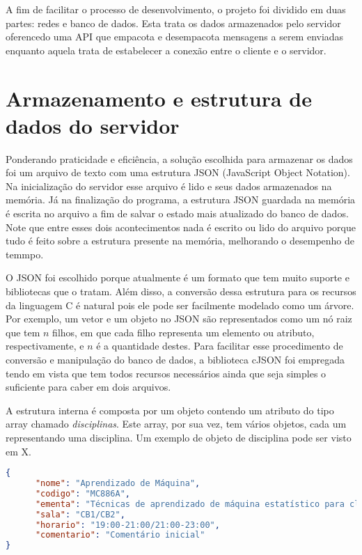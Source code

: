 \documentclass[
	article,			%
	11pt,				%
	oneside,			%
	a4paper,			%
	hidelinks,
	english,			%
	brazil,				%
	sumario=abnt-6027-2012
	]{abntex2}
\begin{document}
A fim de facilitar o processo de desenvolvimento, o projeto foi dividido em duas partes: redes e banco de dados. Esta trata os dados armazenados pelo servidor oferencedo uma API que empacota e desempacota mensagens a serem enviadas enquanto aquela trata de estabelecer a conexão entre o cliente e o servidor.

\section{Armazenamento e estrutura de dados do servidor}

Ponderando praticidade e eficiência, a solução escolhida para armazenar os dados foi um arquivo de texto com uma estrutura JSON (JavaScript Object Notation). Na inicialização do servidor esse arquivo é lido e seus dados armazenados na memória. Já na finalização do programa, a estrutura JSON guardada na memória é escrita no arquivo a fim de salvar o estado mais atualizado do banco de dados. Note que entre esses dois acontecimentos nada é escrito ou lido do arquivo porque tudo é feito sobre a estrutura presente na memória, melhorando o desempenho de temmpo.

O JSON foi escolhido porque atualmente é um formato que tem muito suporte e bibliotecas que o tratam. Além disso, a conversão dessa estrutura para os recursos da linguagem C é natural pois ele pode ser facilmente modelado como um árvore. Por exemplo, um vetor e um objeto no JSON são representados como um nó raiz que tem $n$ filhos, em que cada filho representa um elemento ou atributo, respectivamente, e $n$ é a quantidade destes. Para facilitar esse procedimento de conversão e manipulação do banco de dados, a biblioteca cJSON foi empregada  tendo em vista que tem todos recursos necessários ainda que seja simples o suficiente para caber em dois arquivos.

A estrutura interna é composta por um objeto contendo um atributo do tipo array chamado \textit{disciplinas}. Este array, por sua vez, tem vários objetos, cada um representando uma disciplina. Um exemplo de objeto de disciplina pode ser visto em X.

\begin{lstlisting}[language=json,firstnumber=1]
{
      "nome": "Aprendizado de Máquina",
      "codigo": "MC886A",
      "ementa": "Técnicas de aprendizado de máquina estatístico para classificação, agrupamento e detecção de outliers.",
      "sala": "CB1/CB2",
      "horario": "19:00-21:00/21:00-23:00",
      "comentario": "Comentário inicial"
}
\end{lstlisting}
\end{document}
